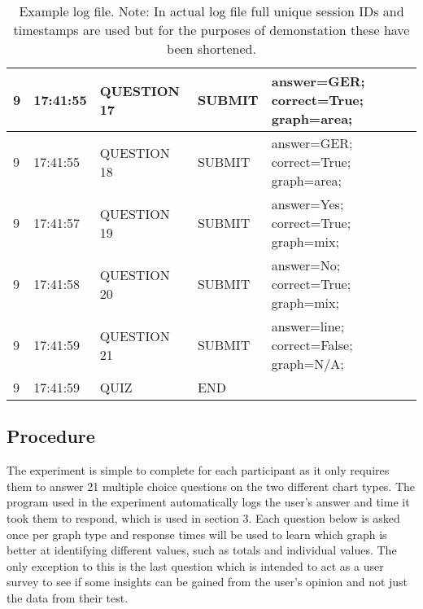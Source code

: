\begin{table}[!ht]
\begin{tabular}{|l|l|l|l|l|}
        9 & 17:41:55 & QUESTION 17 & SUBMIT & answer=GER; correct=True; graph=area; \\ \hline
        9 & 17:41:55 & QUESTION 18 & SUBMIT & answer=GER; correct=True; graph=area; \\ \hline
        9 & 17:41:57 & QUESTION 19 & SUBMIT & answer=Yes; correct=True; graph=mix; \\ \hline
        9 & 17:41:58 & QUESTION 20 & SUBMIT & answer=No; correct=True; graph=mix; \\ \hline
        9 & 17:41:59 & QUESTION 21 & SUBMIT & answer=line; correct=False; graph=N/A; \\ \hline
        9 & 17:41:59 & QUIZ & END & ~ \\ \hline
    \end{tabular}
    \caption{Example log file. Note: In actual log file full unique session IDs and timestamps are used but for the purposes of demonstation these have been shortened.}
\end{table}
\subsection{Procedure}
\begin{flushleft}
    The experiment is simple to complete for each participant as it only requires them to answer 21 multiple choice questions on the two different chart types.
    The program used in the experiment automatically logs the user's answer and time it took them to respond, which is used in section 3. Each question below 
    is asked once per graph type and response times will be used to learn which graph is better at identifying different values, such as totals and individual values.
    The only exception to this is the last question which is intended to act as a user survey to see if some insights can be gained from the user's opinion and not just 
    the data from their test.
\end{flushleft}
